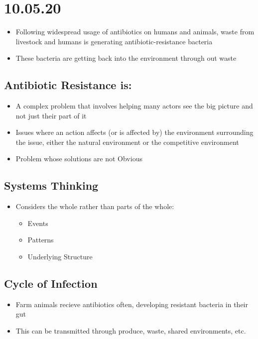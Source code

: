 \documentclass[11pt]{article}
\author{Sudhan Chitgopkar}
\date{\today}
\title{}
\begin{document}
\tableofcontents

\section{10.05.20}
\label{sec:orgf86eb25}
\begin{itemize}
\item Following widespread usage of antibiotics on humans and animals, waste from livestock and humans
is generating antibiotic-resistance bacteria
\item These bacteria are getting back into the environment through out waste
\end{itemize}
\subsection{Antibiotic Resistance is:}
\label{sec:org54766c9}
\begin{itemize}
\item A complex problem that involves helping many actors see the big picture and not just their
part of it
\item Issues where an action affects (or is affected by) the environment surrounding the issue,
either the natural environment or the competitive environment
\item Problem whose solutions are not Obvious
\end{itemize}
\subsection{Systems Thinking}
\label{sec:org041a904}
\begin{itemize}
\item Considers the whole rather than parts of the whole:
\begin{itemize}
\item Events
\item Patterns
\item Underlying Structure
\end{itemize}
\end{itemize}
\subsection{Cycle of Infection}
\label{sec:org6b53104}
\begin{itemize}
\item Farm animals recieve antibiotics often, developing resistant bacteria in their gut
\item This can be transmitted through produce, waste, shared environments, etc.
\end{itemize}
\end{document}

